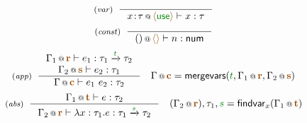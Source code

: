 \begin{figure}[t]
\begin{equation*}
\tyrule{var}
  { }
  {\coctx{x\!:\!\tau}{\alift{\cunit}} \vdash x : \tau }
\end{equation*}
\begin{equation*}
\tyrule{const}
  { }
  {\coctx{()}{\alift{}} \vdash n : \ident{num} }
\end{equation*}
\begin{equation*}
\tyrule{app}
  {\coctx{\Gamma_1}{\aclrd{\textbf{r}}} \vdash e_1 : \tau_1 \xrightarrow{\cclrd{t}} \tau_2 \\
   \coctx{\Gamma_2}{\aclrd{\textbf{s}}} \vdash e_2 : \tau_1 }
  {\coctx{\Gamma}{\aclrd{\textbf{c}}} \vdash e_1~e_2 : \tau_2}
\quad \coctx{\Gamma}{\aclrd{\textbf{c}}} = \ident{mergevars}(\cclrd{t}, \coctx{\Gamma_1}{\aclrd{\textbf{r}}}, \coctx{\Gamma_2}{\aclrd{\textbf{s}}})
\end{equation*}
\begin{equation*}
\tyrule{abs}
  {\coctx{\Gamma_1}{\aclrd{\textbf{t}}} \vdash e : \tau_2}
  {\coctx{\Gamma_2}{\aclrd{\textbf{r}}} \vdash \lambda x:\tau_1.e : \tau_1 \xrightarrow{\cclrd{s}} \tau_2 }
\quad (\coctx{\Gamma_2}{\aclrd{\textbf{r}}}), \tau_1, \cclrd{s} = \ident{findvar}_x(\coctx{\Gamma_1}{\aclrd{\textbf{t}}})
\end{equation*}


\end{figure}
